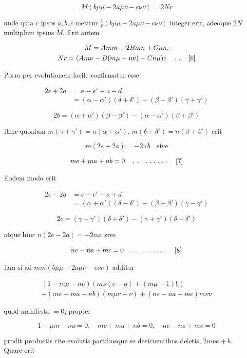 \[
M(b\mu\mu-2a\mu\nu-c\nu\nu)=2Nr
\]

unde quia $r$ ipsos $a,b,c$ metitur $\frac{1}{r}(b\mu\mu-2a\mu\nu-c\nu\nu)$ integer erit, adeoque $2N$ multiplum ipsius $M$. Erit autem

\[
\begin{gathered}M=Amm+2Bmn+Cnn,\\Nr=(Am\nu-B(m\mu-n\nu)-Cn\mu)e\quad\mathinner{.\ .}\quad[6]\end{gathered}
\]

Porro per evolutionem facile confirmatur esse

\[
\begin{aligned}2e+2a&=e-e'+a-d\\&=(\alpha-\alpha')(\delta+\delta')-(\beta-\beta')(\gamma+\gamma')\end{aligned}
\]

\[
2b=(\alpha+\alpha')(\beta-\beta')-(\alpha-\alpha')(\beta+\beta')
\]

Hinc quoniam $m(\gamma+\gamma')=n(\alpha+\alpha')$, $m(\delta+\delta')=n(\beta+\beta')$ erit

\[
m(2e+2a)=-2nb\quad\text{sive}
\]

\[
me+ma+nb=0\quad\mathinner{.\ .\ .\ .\ .\ .\ .\ .\ .}\quad[7]
\]

Eodem modo erit

\[
\begin{aligned}2e-2a&=e-e'-a+d\\&=(\alpha+\alpha')(\delta-\delta')-(\beta+\beta')(\gamma-\gamma')\end{aligned}
\]

\[
2c=(\gamma-\gamma')(\delta+\delta')-(\gamma+\gamma')(\delta-\delta')
\]

atque hinc $n(2e-2a)=-2mc$ sive

\[
ne-na+mc=0\quad\mathinner{.\ .\ .\ .\ .\ .\ .\ .\ .}\quad[8]
\]

Iam si ad $mm(b\mu\mu-2a\mu\nu-c\nu\nu)$ additur

\[
\begin{gathered}(1-m\mu-n\nu)(m\nu(e-a)+(m\mu+1)b)\\+(me+ma+nb)(m\mu\nu+\nu)+(ne-na+mc)m\nu\nu\end{gathered}
\]

quod manifesto $=0$, propter

\[
1-\mu m-\nu u=0,\quad me+ma+nb=0,\quad ne-na+mc=0
\]

prodit productis rite evolutis partibusque se destruentibus deletis, $2m\nu e+b$. Quare erit

